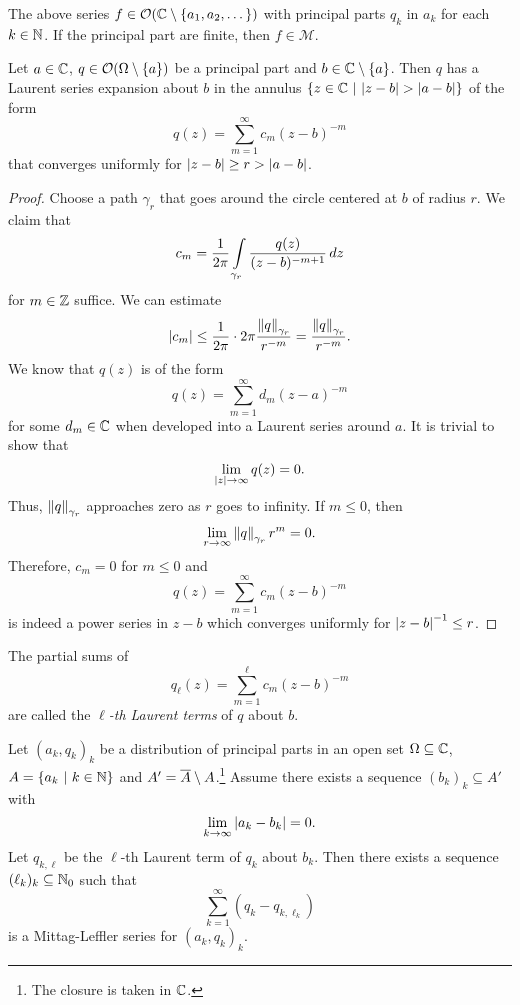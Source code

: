 \begin{opomba}
The above series
$f \in \mathcal{O}(\mathbb{C} \setminus \left\{a_1, a_2, \dots\right\})$ with
principal parts $q_k$ in $a_k$ for each $k \in \mathbb{N}$. If the
principal part are finite, then $f \in \mathcal{M}$.
\end{opomba}

\begin{lema}
Let $a \in \mathbb{C}$, $q \in \mathcal{O} (\Omega \setminus \left\{a\right\})$ be a
principal part and $b \in \mathbb{C} \setminus \left\{a\right\}$. Then $q$ has a
Laurent series expansion about $b$ in the annulus
$\left\{z \in \mathbb{C}~\middle\vert~\left\lvert z - b\right\rvert > \left\lvert a - b\right\rvert\right\}$ of the form
\[
q(z) = \sum_{m=1}^\infty c_m (z-b)^{-m}
\]
that converges uniformly for $\left\lvert z - b\right\rvert \geq r > \left\lvert a - b\right\rvert$.
\end{lema}

\begin{proof}
Choose a path $\gamma_r$ that goes around the circle centered at
$b$ of radius $r$. We claim that
\[
c_m =
\frac{1}{2 \pi} \int\limits_{\gamma_r} \frac{q(z)}{(z-b)^{-m+1}}\,dz
\]
for $m \in \mathbb{Z}$ suffice. We can estimate
\[
\left\lvert c_m\right\rvert \leq
\frac{1}{2 \pi} \cdot 2 \pi \frac{\left\lVert q\right\rVert_{\gamma_r}}{r^{- m}} =
\frac{\left\lVert q\right\rVert_{\gamma_r}}{r^{-m}}.
\]
We know that $q(z)$ is of the form
\[
q(z) = \sum_{m = 1}^{\infty} d_m (z - a)^{-m}
\]
for some $d_m \in \mathbb{C}$ when developed into a Laurent series around
$a$. It is trivial to show that
\[
\lim_{\left\lvert z\right\rvert\to \infty}q(z) = 0.
\]
Thus, $\left\lVert q\right\rVert_{\gamma_r}$ approaches zero as $r$ goes to
infinity. If $m \leq 0$, then
\[
\lim_{r \to \infty} \left\lVert q\right\rVert_{\gamma_r} r^{m} = 0.
\]
Therefore, $c_m = 0$ for $m \leq 0$ and
\[
q(z) = \sum_{m = 1}^{\infty} c_m (z - b)^{ - m}
\]
is indeed a power series in $z-b$ which converges uniformly for
$\left\lvert z - b\right\rvert^{-1} \leq r$.
\end{proof}

\begin{definicija}
The partial sums of
\[
q_\ell(z) = \sum_{m = 1}^{\ell} c_m (z - b)^{ - m}
\]
are called the
\emph{$\ell$-th Laurent terms} of $q$ about
$b$.
\end{definicija}

\begin{lema}
\label{inf_prod:lm:sufficientForML}
Let $(a_k, q_k)_k$ be a distribution of principal parts in an open
set $\Omega \subseteq \mathbb{C}$, $A = \left\{a_k~\middle\vert~k \in \mathbb{N}\right\}$ and
$A' = \overline{A} \setminus A$.\footnote{The closure is taken in
$\mathbb{C}$.} Assume there exists a sequence $(b_k)_k \subseteq A'$ with
\[
\lim_{k \to \infty} \left\lvert a_k - b_k\right\rvert = 0.
\]
Let $q_{k, \ell}$ be the $\ell$-th Laurent term of $q_k$ about
$b_k$. Then there exists a sequence $(\ell_k)_k \subseteq \mathbb{N}_0$
such that
\[
\sum_{k=1}^{\infty}(q_k - q_{k, \ell_k})
\]
is a Mittag-Leffler series for $(a_k, q_k)_k$.
\end{lema}

